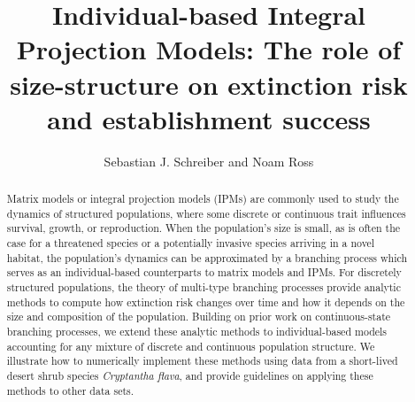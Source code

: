 \documentclass[12pt]{amsart}\usepackage[]{graphicx}\usepackage[]{color}
\begin{document}



\title[Extinction in Individual-based IPMs]{Individual-based Integral Projection Models: The role of size-structure on
  extinction risk and establishment success}
\author{Sebastian J. Schreiber and Noam Ross}
\address{Department of Evolution and Ecology, One Shields Avenue, University of California, Davis, California 95616}
\address{Current Address: Department of Environmental Science and Policy, University of California, Davis, California 95616}
\address{Address effective October 1, 2015: EcoHealth Alliance,
460 West 34th Street – 17th floor, New York, NY 10001  }
\maketitle{}

\begin{abstract}
Matrix models or integral projection models (IPMs) are commonly used to study the dynamics of structured populations, where some discrete or continuous trait influences survival, growth, or reproduction. When the population's size is small, as is often the case for a threatened species or a potentially invasive species arriving in a novel habitat, the population's dynamics can be approximated by a branching process which serves as an individual-based counterparts to matrix models and IPMs. For discretely structured populations, the theory of multi-type branching processes provide analytic methods to compute how extinction risk changes over time and how it depends on the size and composition of the population. Building on prior work on continuous-state branching processes, we extend these analytic methods to individual-based models accounting for any mixture of discrete and continuous population structure. We illustrate how to numerically implement these methods using data from a short-lived desert shrub species \emph{Cryptantha flava}, and provide guidelines on applying these methods to other data sets.
\end{abstract}
\end{document}
